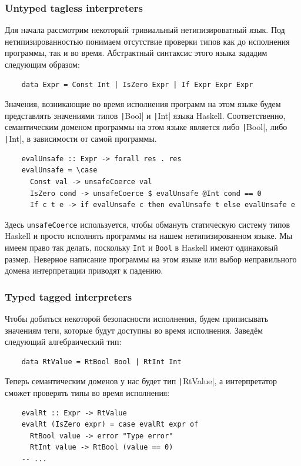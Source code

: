 \subsubsection{Untyped tagless interpreters}

Для начала рассмотрим некоторый тривиальный нетипизироватный язык.
Под нетипизированностью понимаем отсутствие проверки типов как до исполнения программы, так и во время.
Абстрактный синтаксис этого языка зададим следующим образом:
\begin{verbatim}
    data Expr = Const Int | IsZero Expr | If Expr Expr Expr
\end{verbatim}

Значения, возникающие во время исполнения программ на этом языке будем представлять значениями типов \texttt|Bool| и \texttt|Int| языка Haskell.
Соответственно, семантическим доменом программы на этом языке является либо \texttt|Bool|, либо \texttt|Int|, в зависимости от самой программы.
\begin{verbatim}
    evalUnsafe :: Expr -> forall res . res
    evalUnsafe = \case
      Const val -> unsafeCoerce val
      IsZero cond -> unsafeCoerce $ evalUnsafe @Int cond == 0
      If c t e -> if evalUnsafe c then evalUnsafe t else evalUnsafe e
\end{verbatim}

Здесь \texttt{unsafeCoerce} используется, чтобы обмануть статическую систему типов Haskell и просто исполнять программы на нашем нетипизированном языке.
Мы имеем право так делать, поскольку \texttt{Int} и \texttt{Bool} в Haskell имеют одинаковый размер.
Неверное написание программы на этом языке или выбор неправильного домена интерпретации приводят к падению.

\subsubsection{Typed tagged interpreters}

Чтобы добиться некоторой безопасности исполнения, будем приписывать значениям теги, которые будут доступны во время исполнения.
Заведём следующий алгебраический тип:
\begin{verbatim}
    data RtValue = RtBool Bool | RtInt Int
\end{verbatim}

Теперь семантическим доменов у нас будет тип \texttt|RtValue|, а интерпретатор сможет проверять типы во время исполнения:
\begin{verbatim}
    evalRt :: Expr -> RtValue
    evalRt (IsZero expr) = case evalRt expr of
      RtBool value -> error "Type error"
      RtInt value -> RtBool (value == 0)
    -- ...
\end{verbatim}

